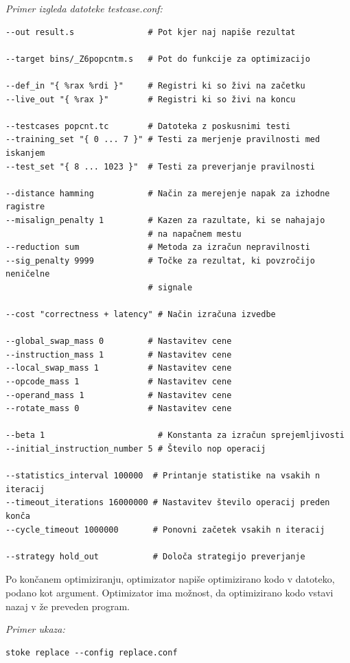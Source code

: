 \documentclass[a4paper, 12pt]{book}
\begin{document}
\noindent
{\it Primer izgleda datoteke testcase.conf:}
\begin{Verbatim}[baselinestretch=1]
--out result.s               # Pot kjer naj napiše rezultat

--target bins/_Z6popcntm.s   # Pot do funkcije za optimizacijo

--def_in "{ %rax %rdi }"     # Registri ki so živi na začetku
--live_out "{ %rax }"        # Registri ki so živi na koncu

--testcases popcnt.tc        # Datoteka z poskusnimi testi
--training_set "{ 0 ... 7 }" # Testi za merjenje pravilnosti med iskanjem
--test_set "{ 8 ... 1023 }"  # Testi za preverjanje pravilnosti

--distance hamming           # Način za merejenje napak za izhodne ragistre
--misalign_penalty 1         # Kazen za razultate, ki se nahajajo 
                             # na napačnem mestu
--reduction sum              # Metoda za izračun nepravilnosti
--sig_penalty 9999           # Točke za rezultat, ki povzročijo neničelne 
                             # signale 

--cost "correctness + latency" # Način izračuna izvedbe

--global_swap_mass 0         # Nastavitev cene
--instruction_mass 1         # Nastavitev cene
--local_swap_mass 1          # Nastavitev cene
--opcode_mass 1              # Nastavitev cene
--operand_mass 1             # Nastavitev cene
--rotate_mass 0              # Nastavitev cene

--beta 1                       # Konstanta za izračun sprejemljivosti
--initial_instruction_number 5 # Število nop operacij

--statistics_interval 100000  # Printanje statistike na vsakih n iteracij
--timeout_iterations 16000000 # Nastavitev število operacij preden konča
--cycle_timeout 1000000       # Ponovni začetek vsakih n iteracij

--strategy hold_out           # Določa strategijo preverjanje
\end{Verbatim}

Po končanem optimiziranju, optimizator napiše optimizirano kodo v datoteko, podano kot argument. Optimizator ima možnost, da optimizirano kodo vstavi nazaj v že preveden program. 

\medskip

\noindent
{\it Primer ukaza:}
\begin{Verbatim}[baselinestretch=1]
stoke replace --config replace.conf
\end{Verbatim}
\medskip
\end{document}
